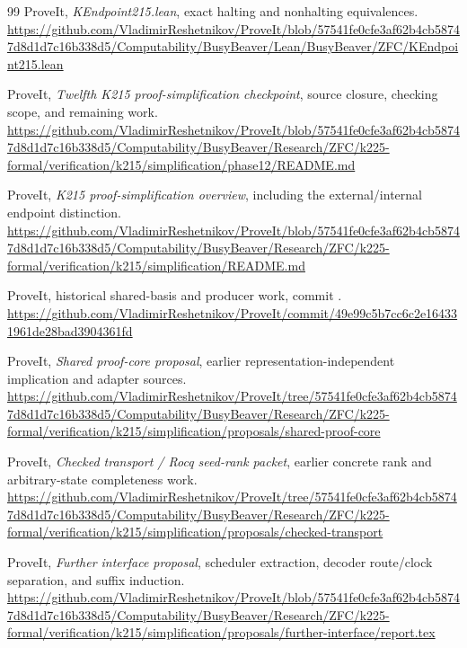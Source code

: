 \documentclass[11pt]{article}
\newcommand{\code}[1]{\texttt{\detokenize{#1}}}
\begin{document}
\begin{thebibliography}{99}
\small
{}
 ProveIt, \emph{KEndpoint215.lean}, exact halting and
nonhalting equivalences.\newline
\url{https://github.com/VladimirReshetnikov/ProveIt/blob/57541fe0cfe3af62b4cb58747d8d1d7c16b338d5/Computability/BusyBeaver/Lean/BusyBeaver/ZFC/KEndpoint215.lean}

 ProveIt, \emph{Twelfth K215 proof-simplification checkpoint},
source closure, checking scope, and remaining work.\newline
\url{https://github.com/VladimirReshetnikov/ProveIt/blob/57541fe0cfe3af62b4cb58747d8d1d7c16b338d5/Computability/BusyBeaver/Research/ZFC/k225-formal/verification/k215/simplification/phase12/README.md}

 ProveIt, \emph{K215 proof-simplification overview},
including the external/internal endpoint distinction.\newline
\url{https://github.com/VladimirReshetnikov/ProveIt/blob/57541fe0cfe3af62b4cb58747d8d1d7c16b338d5/Computability/BusyBeaver/Research/ZFC/k225-formal/verification/k215/simplification/README.md}

 ProveIt, historical shared-basis and producer work,
commit \code{49e99c5b7cc6c2e164331961de28bad3904361fd}.\newline
\url{https://github.com/VladimirReshetnikov/ProveIt/commit/49e99c5b7cc6c2e164331961de28bad3904361fd}

 ProveIt, \emph{Shared proof-core proposal}, earlier
representation-independent implication and adapter sources.\newline
\url{https://github.com/VladimirReshetnikov/ProveIt/tree/57541fe0cfe3af62b4cb58747d8d1d7c16b338d5/Computability/BusyBeaver/Research/ZFC/k225-formal/verification/k215/simplification/proposals/shared-proof-core}

 ProveIt, \emph{Checked transport / Rocq seed-rank
packet}, earlier concrete rank and arbitrary-state completeness work.\newline
\url{https://github.com/VladimirReshetnikov/ProveIt/tree/57541fe0cfe3af62b4cb58747d8d1d7c16b338d5/Computability/BusyBeaver/Research/ZFC/k225-formal/verification/k215/simplification/proposals/checked-transport}

 ProveIt, \emph{Further interface proposal},
scheduler extraction, decoder route/clock separation, and suffix induction.\newline
\url{https://github.com/VladimirReshetnikov/ProveIt/blob/57541fe0cfe3af62b4cb58747d8d1d7c16b338d5/Computability/BusyBeaver/Research/ZFC/k225-formal/verification/k215/simplification/proposals/further-interface/report.tex}


\end{thebibliography}
\end{document}
